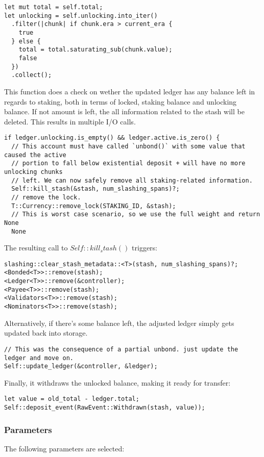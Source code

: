 \documentclass[11pt,a4paper]{article}
\begin{document}
\begin{verbatim}
let mut total = self.total;
let unlocking = self.unlocking.into_iter()
  .filter(|chunk| if chunk.era > current_era {
    true
  } else {
    total = total.saturating_sub(chunk.value);
    false
  })
  .collect();
\end{verbatim}

This function does a check on wether the updated ledger has any balance left in
regards to staking, both in terms of locked, staking balance and unlocking balance.
If not amount is left, the all information related to the stash will be deleted.
This results in multiple I/O calls.

\begin{verbatim}
if ledger.unlocking.is_empty() && ledger.active.is_zero() {
  // This account must have called `unbond()` with some value that caused the active
  // portion to fall below existential deposit + will have no more unlocking chunks
  // left. We can now safely remove all staking-related information.
  Self::kill_stash(&stash, num_slashing_spans)?;
  // remove the lock.
  T::Currency::remove_lock(STAKING_ID, &stash);
  // This is worst case scenario, so we use the full weight and return None
  None
\end{verbatim}

The resulting call to $Self::kill_stash()$ triggers:

\begin{verbatim}
slashing::clear_stash_metadata::<T>(stash, num_slashing_spans)?;
<Bonded<T>>::remove(stash);
<Ledger<T>>::remove(&controller);
<Payee<T>>::remove(stash);
<Validators<T>>::remove(stash);
<Nominators<T>>::remove(stash);
\end{verbatim}

Alternatively, if there's some balance left, the adjusted ledger simply gets
updated back into storage.

\begin{verbatim}
// This was the consequence of a partial unbond. just update the ledger and move on.
Self::update_ledger(&controller, &ledger);
\end{verbatim}

Finally, it withdraws the unlocked balance, making it ready for transfer:

\begin{verbatim}
let value = old_total - ledger.total;
Self::deposit_event(RawEvent::Withdrawn(stash, value));
\end{verbatim}

\subsubsection*{Parameters}
The following parameters are selected:
\end{document}
